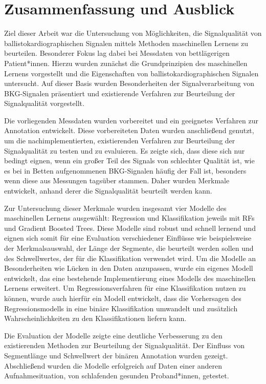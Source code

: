 \chapter{Zusammenfassung und Ausblick}\label{zusammenfassung}

Ziel dieser Arbeit war die Untersuchung von Möglichkeiten, die Signalqualität von ballistokardiographischen Signalen mittels Methoden maschinellen Lernens zu beurteilen. Besonderer Fokus lag dabei bei Messdaten von bettlägerigen Patient*innen. Hierzu wurden zunächst die Grundprinzipien des maschinellen Lernens vorgestellt und die Eigenschaften von ballistokardiographischen Signalen untersucht. Auf dieser Basis wurden Besonderheiten der Signalverarbeitung von \ac{BKG}-Signalen präsentiert und existierende Verfahren zur Beurteilung der Signalqualität vorgestellt.

Die vorliegenden Messdaten wurden vorbereitet und ein geeignetes Verfahren zur Annotation entwickelt. Diese vorbereiteten Daten wurden anschließend genutzt, um die nachimplementierten, existierenden Verfahren zur Beurteilung der Signalqualität zu testen und zu evaluieren. Es zeigte sich, dass diese sich nur bedingt eignen, wenn ein großer Teil des Signals von schlechter Qualität ist, wie es bei in Betten aufgenommenen \ac{BKG}-Signalen häufig der Fall ist, besonders wenn diese aus Messungen tagsüber stammen. Daher wurden Merkmale entwickelt, anhand derer die Signalqualität beurteilt werden kann.

Zur Untersuchung dieser Merkmale wurden insgesamt vier Modelle des maschinellen Lernens ausgewählt: Regression und Klassifikation jeweils mit \acl{RF}s und Gradient Boosted Trees. Diese Modelle sind robust und schnell lernend und eignen sich somit für eine Evaluation verschiedener Einflüsse wie beispielsweise der Merkmalsauswahl, der Länge der Segmente, die beurteilt werden sollen und des Schwellwertes, der für die Klassifikation verwendet wird. Um die Modelle an Besonderheiten wie Lücken in den Daten anzupassen, wurde ein eigenes Modell entwickelt, das eine bestehende Implementierung eines Modells des maschinellen Lernens erweitert. Um Regressionsverfahren für eine Klassifikation nutzen zu können, wurde auch hierfür ein Modell entwickelt, dass die Vorhersagen des Regressionsmodells in eine binäre Klassifikation umwandelt und zusätzlich Wahrscheinlichkeiten zu den Klassifikationen liefern kann.

Die Evaluation der Modelle zeigte eine deutliche Verbesserung zu den existierenden Methoden zur Beurteilung der Signalqualität. Der Einfluss von Segmentlänge und Schwellwert der binären Annotation wurden gezeigt. Abschließend wurden die Modelle erfolgreich auf Daten einer anderen Aufnahmesituation, von schlafenden gesunden Proband*innen, getestet.

